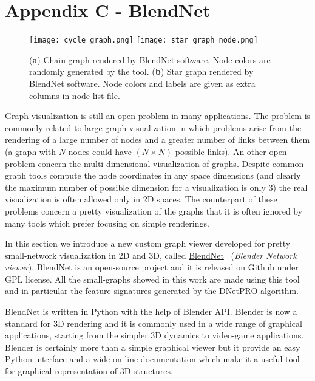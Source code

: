 \documentclass{standalone}
\begin{document}
\chapter*{Appendix C - BlendNet}

\begin{figure}[htbp]
\centering
\texttt{[image: cycle\_graph.png]}
\qquad\qquad
\texttt{[image: star\_graph\_node.png]}
\caption{(\textbf{a}) Chain graph rendered by \textsf{BlendNet} software.
Node colors are randomly generated by the tool.
(\textbf{b}) Star graph rendered by \textsf{BlendNet} software.
Node colors and labels are given as extra columns in node-list file.
}
\label{fig:blendnet}
\end{figure}

Graph visualization is still an open problem in many applications.
The problem is commonly related to large graph visualization in which problems arise from the rendering of a large number of nodes and a greater number of links between them (a graph with $N$ nodes could have $(N \times N)$ possible links).
An other open problem concern the multi-dimensional visualization of graphs.
Despite common graph tools compute the node coordinates in any space dimensions (and clearly the maximum number of possible dimension for a visualization is only 3) the real visualization is often allowed only in 2D spaces.
The counterpart of these problems concern a pretty visualization of the graphs that it is often ignored by many tools which prefer focusing on simple renderings.

In this section we introduce a new custom graph viewer developed for pretty small-network visualization in 2D and 3D, called \href{https://github.com/Nico-Curti/BlendNet}{\textsf{BlendNet}}~\cite{BlendNet} (\emph{Blender Network viewer}).
\textsf{BlendNet} is an open-source project and it is released on Github under GPL license.
All the small-graphs showed in this work are made using this tool and in particular the feature-signatures generated by the \textsf{DNetPRO} algorithm.

\textsf{BlendNet} is written in \textsf{Python} with the help of \textsf{Blender} API.
\textsf{Blender} is now a standard for 3D rendering and it is commonly used in a wide range of graphical applications, starting from the simpler 3D dynamics to video-game applications.
\textsf{Blender} is certainly more than a simple graphical viewer but it provide an easy \textsf{Python} interface and a wide on-line documentation which make it a useful tool for graphical representation of 3D structures.
\end{document}
